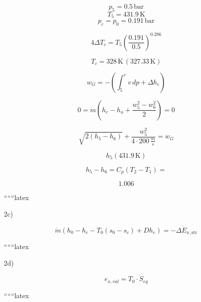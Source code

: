 \[
p_5 = 0.5 \, \text{bar}
\]
\[
T_5 = 431.9 \, \text{K}
\]
\[
p_c = p_0 = 0.191 \, \text{bar}
\]

\[
4 \Delta T_c = T_5 \left( \frac{0.191}{0.5} \right)^{0.286}
\]

\[
T_c = 328 \, \text{K} \, (327.33 \, \text{K})
\]

\[
w_G = - \left( \int_{5}^{c} v \, dp + \Delta h_e \right)
\]

 \quad \Rightarrow \quad {}

\[
0 = \dot{m} \left( h_e - h_a + \frac{w_5^2 - w_6^2}{2} \right) = 0
\]

\[
\sqrt{2 (h_5 - h_6)} + \frac{w_5^2}{4 \cdot 200 \, \frac{m}{s}} = w_G
\]

\[
h_5 (431.9 \, \text{K})
\]

\[
h_5 - h_6 = C_p (T_2 - T_1) =
\]

\[
1.006
\]

``````latex


2c)

\[
\dot{m} \left( h_0 - h_c - T_0 (s_0 - s_c) + D h_e \right) = - \Delta \dot{E}_{x, \text{str}}
\]

``````latex


2d)

\[ e_{x,val} = T_0 \cdot \dot{S}_{eq} \]

``````latex


